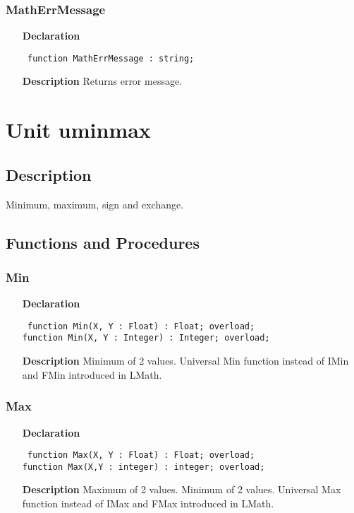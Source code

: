 \documentclass[12pt,a4paper,oneside]{report}
\newcommand{\lmath}[1]{   %
	\marginpar{\vspace{#1} 
		\begin{flushright}
			LMath
	\end{flushright} }
}
\newcommand{\declarationitem}[1]{\textbf{#1}}
\newcommand{\descriptiontitle}[1]{\textbf{#1}}
\newcommand{\code}[1]{\texttt{#1}}
\begin{document}
\subsubsection{MathErrMessage}
\lmath{-24pt}
\label{uErrors-MathErrMessage}
\begin{itemize}\item[\declarationitem{Declaration}\hfill]
	\begin{flushleft}
		\code{
			function MathErrMessage : string;}
	\end{flushleft}
	\item[\descriptiontitle{Description}]
	Returns error message.
\end{itemize}

\section{Unit uminmax}
\label{uminmax}
\subsection{Description}
Minimum, maximum, sign and exchange. 
\subsection{Functions and Procedures}
\subsubsection{Min}\lmath{-24pt}
\label{uminmax-Min}
\begin{itemize}\item[\declarationitem{Declaration}\hfill]
	\begin{flushleft}
		\code{
			function Min(X, Y : Float) : Float; overload;\\
			function Min(X, Y : Integer) : Integer; overload;}
	\end{flushleft}
	\item[\descriptiontitle{Description}]
	Minimum of 2 values. Universal Min function instead of IMin and FMin introduced in LMath.
\end{itemize}
\subsubsection{Max}\lmath{-24pt}
\label{uminmax-Max}
\begin{itemize}\item[\declarationitem{Declaration}\hfill]
	\begin{flushleft}
		\code{
			function Max(X, Y : Float) : Float; overload;\\
			function Max(X,Y : integer) : integer; overload;}
	\end{flushleft}
	\item[\descriptiontitle{Description}]
	Maximum of 2 values. 	Minimum of 2 values. Universal Max function instead of IMax and FMax introduced in LMath.
	
\end{itemize}
\end{document}
